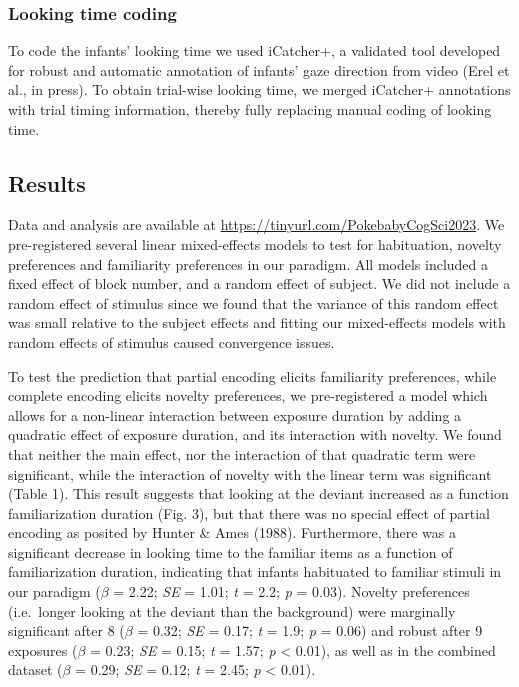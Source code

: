 \documentclass[10pt, letterpaper]{article}
\begin{document}
\hypertarget{looking-time-coding}{%
\subsubsection{Looking time coding}\label{looking-time-coding}}

To code the infants' looking time we used iCatcher+, a validated tool
developed for robust and automatic annotation of infants' gaze direction
from video (Erel et al., in press). To obtain trial-wise looking time,
we merged iCatcher+ annotations with trial timing information, thereby
fully replacing manual coding of looking time.

\hypertarget{results-1}{%
\subsection{Results}\label{results-1}}

Data and analysis are available at
\url{https://tinyurl.com/PokebabyCogSci2023}. We pre-registered several
linear mixed-effects models to test for habituation, novelty preferences
and familiarity preferences in our paradigm. All models included a fixed
effect of block number, and a random effect of subject. We did not
include a random effect of stimulus since we found that the variance of
this random effect was small relative to the subject effects and fitting
our mixed-effects models with random effects of stimulus caused
convergence issues.

To test the prediction that partial encoding elicits familiarity
preferences, while complete encoding elicits novelty preferences, we
pre-registered a model which allows for a non-linear interaction between
exposure duration by adding a quadratic effect of exposure duration, and
its interaction with novelty. We found that neither the main effect, nor
the interaction of that quadratic term were significant, while the
interaction of novelty with the linear term was significant (Table 1).
This result suggests that looking at the deviant increased as a function
familiarization duration (Fig. 3), but that there was no special effect
of partial encoding as posited by Hunter \& Ames (1988). Furthermore,
there was a significant decrease in looking time to the familiar items
as a function of familiarization duration, indicating that infants
habituated to familiar stimuli in our paradigm (\(\beta\) = 2.22;
\emph{SE} = 1.01; \emph{t} = 2.2; \emph{p} = 0.03). Novelty preferences
(i.e.~longer looking at the deviant than the background) were marginally
significant after 8 (\(\beta\) = 0.32; \emph{SE} = 0.17; \emph{t} = 1.9;
\emph{p} = 0.06) and robust after 9 exposures (\(\beta\) = 0.23;
\emph{SE} = 0.15; \emph{t} = 1.57; \emph{p} \textless{} 0.01), as well
as in the combined dataset (\(\beta\) = 0.29; \emph{SE} = 0.12; \emph{t}
= 2.45; \emph{p} \textless{} 0.01).
\end{document}
